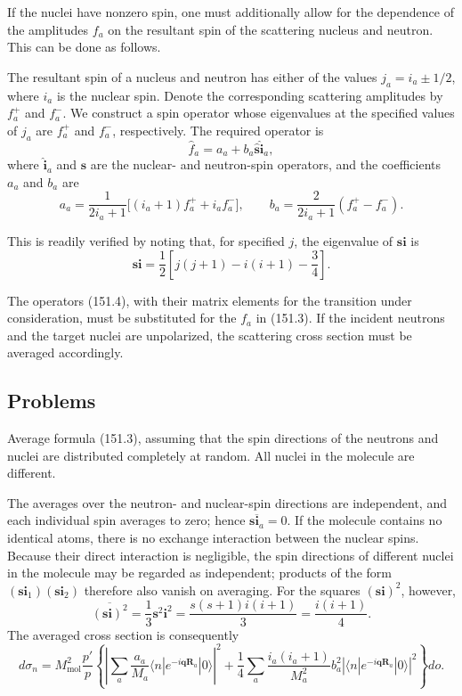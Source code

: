 If the nuclei have nonzero spin, one must additionally allow for the dependence of the amplitudes $f_a$ on the resultant spin of the scattering nucleus and neutron. This can be done as follows.

The resultant spin of a nucleus and neutron has either of the values $j_a=i_a\pm1/2$, where $i_a$ is the nuclear spin. Denote the corresponding scattering amplitudes by $f_a^+$ and $f_a^-$. We construct a spin operator whose eigenvalues at the specified values of $j_a$ are $f_a^+$ and $f_a^-$, respectively. The required operator is
\begin{equation}
 \hat f_a=a_a+b_a\hat{\mathbf s}\hat{\mathbf i}_a,
 \tag{151.4}
\end{equation}
where $\hat{\mathbf i}_a$ and $\hat{\mathbf s}$ are the nuclear- and neutron-spin operators, and the coefficients $a_a$ and $b_a$ are
\begin{equation}
 a_a=\frac1{2i_a+1}\big[(i_a+1)f_a^++i_af_a^-\big],\qquad
 b_a=\frac2{2i_a+1}(f_a^+-f_a^-).
 \tag{151.5}
\end{equation}

This is readily verified by noting that, for specified $j$, the eigenvalue of $\mathbf s\mathbf i$ is
\[
 \mathbf s\mathbf i=\frac12\left[j(j+1)-i(i+1)-\frac34\right].
\]

The operators (151.4), with their matrix elements for the transition under consideration, must be substituted for the $f_a$ in (151.3). If the incident neutrons and the target nuclei are unpolarized, the scattering cross section must be averaged accordingly.

\subsection*{Problems}

 Average formula (151.3), assuming that the spin directions of the neutrons and nuclei are distributed completely at random. All nuclei in the molecule are different.

\SolutionHeading The averages over the neutron- and nuclear-spin directions are independent, and each individual spin averages to zero; hence $\overline{\mathbf s\mathbf i_a}=0$. If the molecule contains no identical atoms, there is no exchange interaction between the nuclear spins. Because their direct interaction is negligible, the spin directions of different nuclei in the molecule may be regarded as independent; products of the form $(\mathbf s\mathbf i_1)(\mathbf s\mathbf i_2)$ therefore also vanish on averaging. For the squares $(\mathbf s\mathbf i)^2$, however,
\[
 \overline{(\mathbf s\mathbf i)^2}=\frac13\mathbf s^2\mathbf i^2
 =\frac{s(s+1)i(i+1)}3=\frac{i(i+1)}4.
\]
The averaged cross section is consequently
\[
 d\sigma_n=M_\text{mol}^2\frac{p'}p\left\{
 \left|\sum_a\frac{a_a}{M_a}\langle n|e^{-i\mathbf q\mathbf R_a}|0\rangle\right|^2
 +\frac14\sum_a\frac{i_a(i_a+1)}{M_a^2}b_a^2
 \left|\langle n|e^{-i\mathbf q\mathbf R_a}|0\rangle\right|^2\right\}do.
\]

